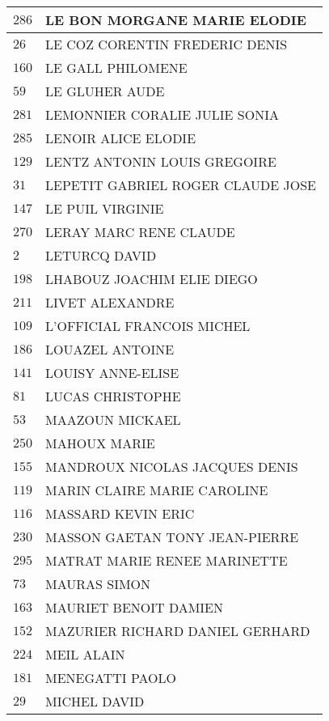 \begin{xltabular}{\linewidth}{|l|X|}
    \hline
    $286$ & LE BON MORGANE MARIE ELODIE \\
    \hline
    $26$ & LE COZ CORENTIN FREDERIC DENIS \\
    \hline
    $160$ & LE GALL PHILOMENE \\
    \hline
    $59$ & LE GLUHER AUDE \\
    \hline
    $281$ & LEMONNIER CORALIE JULIE SONIA \\
    \hline
    $285$ & LENOIR ALICE ELODIE \\
    \hline
    $129$ & LENTZ ANTONIN LOUIS GREGOIRE \\
    \hline
    $31$ & LEPETIT GABRIEL ROGER CLAUDE JOSE \\
    \hline
    $147$ & LE PUIL VIRGINIE \\
    \hline
    $270$ & LERAY MARC RENE CLAUDE \\
    \hline
    $2$ & LETURCQ DAVID \\
    \hline
    $198$ & LHABOUZ JOACHIM ELIE DIEGO \\
    \hline
    $211$ & LIVET ALEXANDRE \\
    \hline
    $109$ & L'OFFICIAL FRANCOIS MICHEL \\
    \hline
    $186$ & LOUAZEL ANTOINE \\
    \hline
    $141$ & LOUISY ANNE-ELISE \\
    \hline
    $81$ & LUCAS CHRISTOPHE \\
    \hline
    $53$ & MAAZOUN MICKAEL \\
    \hline
    $250$ & MAHOUX MARIE \\
    \hline
    $155$ & MANDROUX NICOLAS JACQUES DENIS \\
    \hline
    $119$ & MARIN CLAIRE MARIE CAROLINE \\
    \hline
    $116$ & MASSARD KEVIN ERIC \\
    \hline
    $230$ & MASSON GAETAN TONY JEAN-PIERRE \\
    \hline
    $295$ & MATRAT MARIE RENEE MARINETTE \\
    \hline
    $73$ & MAURAS SIMON \\
    \hline
    $163$ & MAURIET BENOIT DAMIEN \\
    \hline
    $152$ & MAZURIER RICHARD DANIEL GERHARD \\
    \hline
    $224$ & MEIL ALAIN \\
    \hline
    $181$ & MENEGATTI PAOLO \\
    \hline
    $29$ & MICHEL DAVID \\

\end{xltabular}
